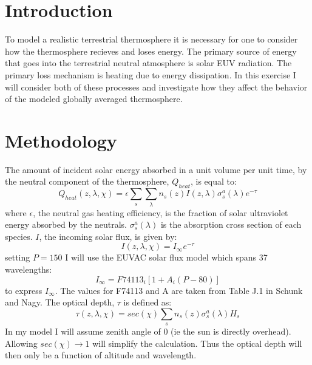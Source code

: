 \documentclass[10pt]{article}
\begin{document}
\begin{multicols}{2}
\section{Introduction}
To model a realistic terrestrial thermosphere it is necessary for one to consider how the thermosphere recieves and loses energy. The primary source of energy that goes into the terrestrial neutral atmosphere is solar EUV radiation. The primary loss mechanism is heating due to energy dissipation. In this exercise I will consider both of these processes and investigate how they affect the behavior of the modeled globally averaged thermosphere.



\section{Methodology}
The amount of incident solar energy absorbed in a unit volume per unit time, by the neutral component of the thermosphere, $Q_{heat}$, is equal to:
\begin{equation} 
Q_{heat}(z,\lambda,\chi) = \epsilon \sum_s \sum_\lambda n_s(z)I(z,\lambda)\sigma^a_s(\lambda)e^{-\tau}
\end{equation}
where $\epsilon$, the neutral gas heating efficiency, is the fraction of solar ultraviolet energy absorbed by the neutrals. $\sigma^a_s(\lambda)$ is the absorption cross section of each species. $I$, the incoming solar flux, is given by:
\begin{equation}
I(z,\lambda,\chi) = I_\infty e^{-\tau}
\end{equation}
setting $P=150$ I will use the EUVAC solar flux model which spans 37 wavelengths:
\begin{equation}
I_\infty = F74113_i[1 + A_i(P-80)]
\end{equation}
to express $I_\infty$. The values for F74113 and A are taken from Table J.1 in Schunk and Nagy. The optical depth, $\tau$ is defined as:
\begin{equation}
\tau(z,\lambda,\chi) = sec(\chi) \sum_s n_s(z) \sigma^a_s(\lambda) H_s
\end{equation}
In my model I will assume zenith angle of 0 (ie the sun is directly overhead). Allowing $sec(\chi)\rightarrow1$ will simplify the calculation. Thus the optical depth will then only be a function of altitude and wavelength. 


\end{multicols}
\end{document}
